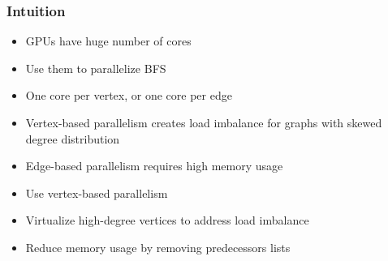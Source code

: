 \begin{frame}
\end{frame}


\begin{frame}
  \frametitle{Intuition}

  \begin{itemize}
    \item GPUs have huge number of cores
    \item Use them to parallelize BFS
    \item One core per vertex, or one core per edge
    \item Vertex-based parallelism creates load imbalance for graphs with skewed degree distribution
    \item Edge-based parallelism requires high memory usage
  \end{itemize}
  \begin{itemize}
    \item Use vertex-based parallelism
    \item Virtualize high-degree vertices to address load imbalance
    \item Reduce memory usage by removing predecessors lists
  \end{itemize}

\end{frame}


